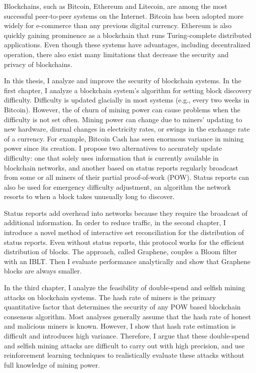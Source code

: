 
Blockchains, such as Bitcoin, Ethereum and Litecoin, are among the most successful peer-to-peer systems on the Internet. Bitcoin has been adopted more widely for e-commerce than any previous digital currency. Ethereum is also quickly gaining prominence as a blockchain that runs Turing-complete distributed applications. Even though these systems have advantages, including decentralized operation, there also exist many limitations that decrease the security and privacy of blockchains.

In this thesis, I analyze and improve the security of blockchain systems. In the first chapter, I analyze a blockchain system's algorithm for setting block discovery difficulty. Difficulty is updated glacially in most systems (e.g., every two weeks in Bitcoin). However, the of churn of mining power can cause problems when the difficulty is not set often. Mining power can change due to miners' updating to new hardware, diurnal changes in electricity rates, or swings in the exchange rate of a currency. For example, Bitcoin Cash has seen enormous variance in mining power since its creation. I propose two alternatives to accurately update difficulty: one that solely uses information that is currently available in blockchain networks, and another based on status reports regularly broadcast from some or all miners of their partial proof-of-work (POW). Status reports can also be used for emergency difficulty adjustment, an algorithm the network resorts to when a block takes unusually long to discover.

Status reports add overhead into networks because they require the broadcast of additional information. In order to reduce traffic, in the second chapter, I introduce a novel method of interactive set reconciliation for the distribution of status reports. Even without status reports, this protocol works for the efficient distribution of blocks. The approach, called Graphene, couples a Bloom filter with an IBLT. Then I evaluate performance analytically and show that Graphene blocks are always smaller.

In the third chapter, I analyze the feasibility of double-spend and selfish mining attacks on blockchain systems. The hash rate of miners is the primary quantitative factor that determines the security of any POW based blockchain consensus algorithm. Most analyses generally assume that the hash rate of honest and malicious miners is known. However, I show that hash rate estimation is difficult and introduces high variance. Therefore, I argue that these double-spend and selfish mining attacks are difficult to carry out with high precision, and use reinforcement learning techniques to realistically evaluate these attacks without full knowledge of mining power.
